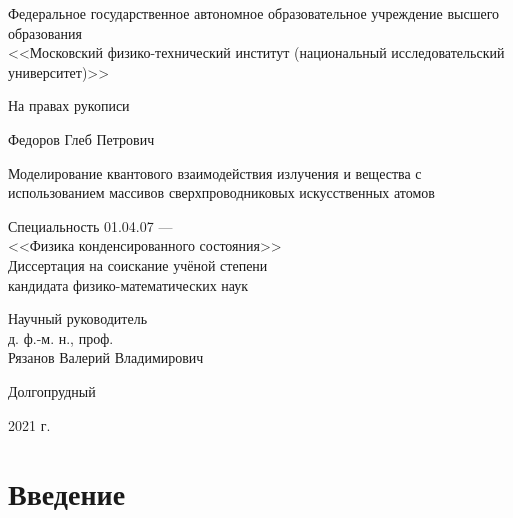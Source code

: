 \documentclass[14pt, a4paper]{extreport}
\numberwithin{equation}{section}
\begin{document}
\begin{titlepage}
\par 
\vspace*{-2cm}
\begin{center}
Федеральное государственное автономное образовательное учреждение высшего образования \\
<<Московский физико-технический институт (национальный исследовательский университет)>> 
\end{center}

\vspace*{0.2cm}
\begin{flushright}
На правах рукописи
\end{flushright}

\vfill

\begin{center}
Федоров Глеб Петрович

\vspace*{0.5cm}

{\large Моделирование квантового взаимодействия излучения и вещества с использованием массивов сверхпроводниковых искусственных атомов}


\begin{center}
Специальность 01.04.07 ---\\ <<Физика конденсированного состояния>>\\
\vspace{0.5cm}
Диссертация на соискание учёной степени \\
кандидата физико-математических наук
\end{center}


\vspace*{2cm}


\begin{flushright}
Научный руководитель\\
д. ф.-м. н., проф.\\
Рязанов Валерий Владимирович
\end{flushright}



\vfill

Долгопрудный

2021 г. 
\end {center} 
\end{titlepage}


\tableofcontents

\chapter*{Введение}
\end{document}
